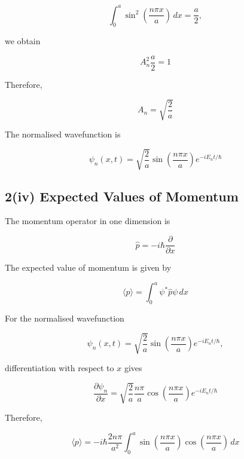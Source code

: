 \documentclass{article}
\begin{document}
\begin{equation*}
\int_0^a \sin^2\left(\frac{n\pi x}{a}\right)\,dx = \frac{a}{2},
\end{equation*}

we obtain

\begin{equation*}
A_n^2\frac{a}{2}=1
\end{equation*}

Therefore,

\begin{equation*}
\boxed{A_n=\sqrt{\frac{2}{a}}}
\end{equation*}

The normalised wavefunction is

\begin{equation*}
\boxed{\psi_n(x,t) = \sqrt{\frac{2}{a}} \sin\left(\frac{n\pi x}{a}\right) e^{-iE_nt/\hbar}}
\end{equation*}



\subsection*{2(iv) Expected Values of Momentum}

The momentum operator in one dimension is

\begin{equation*}
\hat{p}=-i\hbar\frac{\partial}{\partial x}
\end{equation*}

The expected value of momentum is given by

\begin{equation*}
\langle p\rangle = \int_0^a \psi^*\hat{p}\psi\,dx
\end{equation*}

For the normalised wavefunction

\begin{equation*}
\psi_n(x,t) = \sqrt{\frac{2}{a}} \sin\left(\frac{n\pi x}{a}\right) e^{-iE_nt/\hbar},
\end{equation*}

differentiation with respect to $x$ gives

\begin{equation*}
\frac{\partial\psi_n}{\partial x} = \sqrt{\frac{2}{a}} \frac{n\pi}{a} \cos\left(\frac{n\pi x}{a}\right) e^{-iE_nt/\hbar}
\end{equation*}

Therefore,

\begin{equation*}
\langle p\rangle = -i\hbar\frac{2n\pi}{a^2} \int_0^a \sin\left(\frac{n\pi x} {a}\right) \cos\left(\frac{n\pi x}{a}\right) \,dx
\end{equation*}
\end{document}
